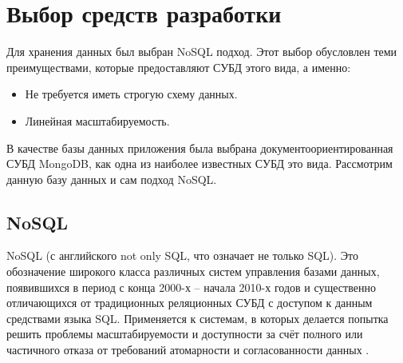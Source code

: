\documentclass[14pt]{extreport}
\begin{document}
\chapter{Выбор средств разработки}
Для хранения данных был выбран NoSQL подход. Этот выбор обусловлен теми преимуществами, которые предоставляют СУБД этого вида, а именно:
\begin{itemize}
\item Не требуется иметь строгую схему данных.
\item Линейная масштабируемость.
\end{itemize}

В качестве базы данных приложения была выбрана документоориентированная СУБД MongoDB, как одна из наиболее известных СУБД это вида. Рассмотрим данную базу данных и сам подход NoSQL.


\section{NoSQL}
NoSQL (с английского not only SQL, что означает не только SQL). Это обозначение широкого класса различных систем управления базами данных, появившихся в период с конца 2000-х -- начала 2010-х годов и существенно отличающихся от традиционных реляционных СУБД с доступом к данным средствами языка SQL. Применяется к системам, в которых делается попытка решить проблемы масштабируемости и доступности за счёт полного или частичного отказа от требований атомарности и согласованности данных \cite{nosqlFauler}. 
\end{document}
